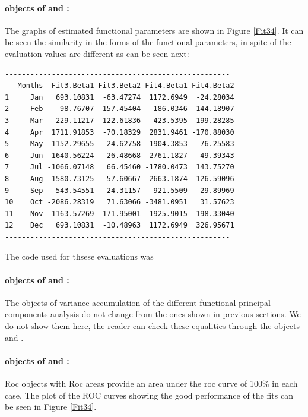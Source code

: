 \paragraph{ objects of  and :} The graphs of estimated functional parameters are shown in Figure \ref{Fit34}. It can be seen the similarity in the forms of the functional parameters, in spite of the evaluation values are different as can be seen next:
\begin{center}
\begin{verbatim}
-----------------------------------------------------
   Months  Fit3.Beta1 Fit3.Beta2 Fit4.Beta1 Fit4.Beta2 
1     Jan   693.10831  -63.47274  1172.6949  -24.28034
2     Feb   -98.76707 -157.45404  -186.0346 -144.18907
3     Mar  -229.11217 -122.61836  -423.5395 -199.28285
4     Apr  1711.91853  -70.18329  2831.9461 -170.88030
5     May  1152.29655  -24.62758  1904.3853  -76.25583
6     Jun -1640.56224   26.48668 -2761.1827   49.39343
7     Jul -1066.07148   66.45460 -1780.0473  143.75270
8     Aug  1580.73125   57.60667  2663.1874  126.59096
9     Sep   543.54551   24.31157   921.5509   29.89969
10    Oct -2086.28319   71.63066 -3481.0951   31.57623
11    Nov -1163.57269  171.95001 -1925.9015  198.33040
12    Dec   693.10831  -10.48963  1172.6949  326.95671
-----------------------------------------------------
\end{verbatim}
\end{center}
\noindent The code used for thsese evaluations was 


\paragraph{ objects of  and :} The objects of variance accumulation of the different functional principal components analysis do not change from the ones shown in previous sections. We do not show them here, the reader can check these equalities through the objects  and . 

\paragraph{  objects of  and :} Roc objects with Roc areas provide an area under the roc curve of 100\% in each case. The plot of the ROC curves showing the good performance of the fits can be seen in Figure \ref{Fit34}.  


